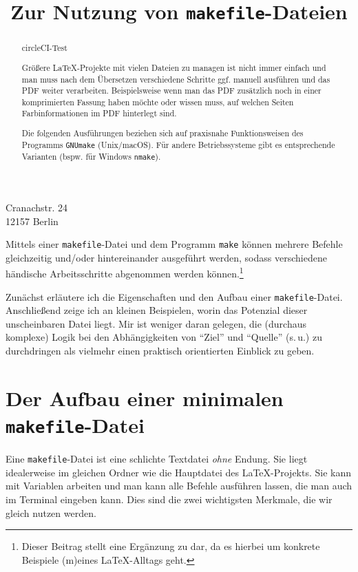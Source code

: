 \documentclass[ngerman]{dtk}
\begin{document}
\title{Zur Nutzung von \texttt{makefile}-Dateien}
%
{Cranachstr. 24\\
12157 Berlin\\
}
\maketitle

\begin{abstract} 
circleCI-Test

Größere \LaTeX -Projekte mit vielen Dateien zu managen ist nicht immer einfach
und man muss nach dem Übersetzen verschiedene Schritte ggf. manuell ausführen und das PDF weiter verarbeiten.
Beispielsweise wenn man das PDF zusätzlich noch in einer komprimierten
Fassung haben möchte oder wissen muss,
auf welchen Seiten Farbinformationen im PDF
hinterlegt sind.

Die folgenden Ausführungen beziehen sich auf praxisnahe Funktionsweisen des Programms \texttt{GNUmake} (Unix/macOS).
Für andere Betriebssysteme gibt es entsprechende Varianten (bspw. für Windows  \texttt{nmake}).
\end{abstract}

Mittels einer \texttt{makefile}-Datei und dem Programm \texttt{make} können mehrere Befehle gleichzeitig und/oder
hintereinander ausgeführt werden,
sodass verschiedene händische Arbeitsschritte abgenommen werden können.\footnote{Dieser Beitrag stellt eine Ergänzung zu
 \parencite{dtk01.1:niepraschk:make} dar,
da es hierbei um konkrete Beispiele (m)eines \LaTeX -Alltags geht.}

Zunächst erläutere ich die Eigenschaften und den Aufbau einer \texttt{makefile}-Datei.
Anschließend zeige ich an kleinen Beispielen,
worin das Potenzial dieser unscheinbaren Datei liegt.
Mir ist weniger daran gelegen,
die (durchaus komplexe) Logik bei den Abhängigkeiten von \enquote{Ziel}
und \enquote{Quelle} (s.\,u.) zu durchdringen \parencite{peschel-findelsen}
als vielmehr einen praktisch orientierten Einblick zu geben.

\section{Der Aufbau einer minimalen \texttt{makefile}-Datei}
Eine \texttt{makefile}-Datei ist eine schlichte Textdatei \emph{ohne} Endung.
Sie liegt idealerweise im gleichen Ordner wie die Hauptdatei des \LaTeX -Projekts.
Sie kann mit Variablen arbeiten und man kann alle Befehle ausführen lassen,
die man auch im Terminal eingeben kann.
Dies sind die zwei wichtigsten Merkmale,
die wir gleich nutzen werden.
\end{document}

